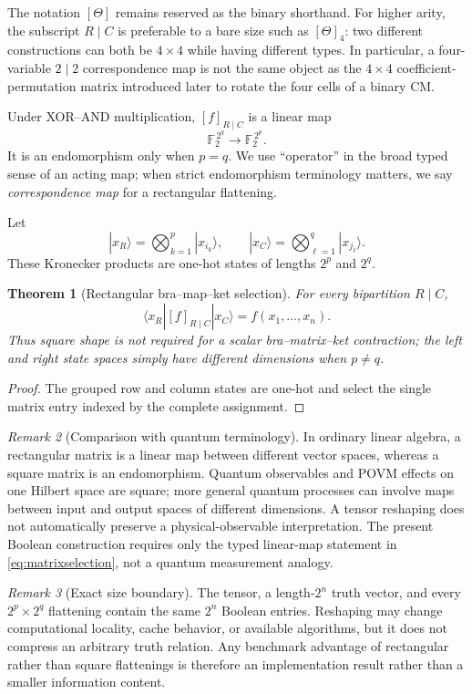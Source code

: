 \documentclass[11pt]{article}
\newtheorem{theorem}{Theorem}[section]
\theoremstyle{definition}
\theoremstyle{remark}
\newtheorem{remark}[theorem]{Remark}
\newcommand{\F}{\mathbb F}
\begin{document}
The notation $[\Theta]$ remains reserved as the binary shorthand.  For higher arity, the subscript $R\mid C$ is preferable to a bare size such as $[\Theta]_4$: two different constructions can both be $4\times4$ while having different types.  In particular, a four-variable $2\mid2$ correspondence map is not the same object as the $4\times4$ coefficient-permutation matrix introduced later to rotate the four cells of a binary CM.

Under XOR--AND multiplication, $[f]_{R\mid C}$ is a linear map
\[
 \F_2^{\,2^q}\longrightarrow\F_2^{\,2^p}.
\]
It is an endomorphism only when $p=q$.  We use ``operator'' in the broad typed sense of an acting map; when strict endomorphism terminology matters, we say \emph{correspondence map} for a rectangular flattening.

Let
\[
 |x_R\rangle=\bigotimes_{k=1}^p|x_{i_k}\rangle,
 \qquad
 |x_C\rangle=\bigotimes_{\ell=1}^q|x_{j_\ell}\rangle.
\]
These Kronecker products are one-hot states of lengths $2^p$ and $2^q$.
\begin{theorem}[Rectangular bra--map--ket selection]
For every bipartition $R\mid C$,
\begin{equation}
 \langle x_R|[f]_{R\mid C}|x_C\rangle
 =f(x_1,\ldots,x_n).
 \label{eq:matrixselection}
\end{equation}
Thus square shape is not required for a scalar bra--matrix--ket contraction; the left and right state spaces simply have different dimensions when $p\ne q$.
\end{theorem}
\begin{proof}
The grouped row and column states are one-hot and select the single matrix entry indexed by the complete assignment.
\end{proof}

\begin{remark}[Comparison with quantum terminology]
In ordinary linear algebra, a rectangular matrix is a linear map between different vector spaces, whereas a square matrix is an endomorphism.  Quantum observables and POVM effects on one Hilbert space are square; more general quantum processes can involve maps between input and output spaces of different dimensions.  A tensor reshaping does not automatically preserve a physical-observable interpretation.  The present Boolean construction requires only the typed linear-map statement in \eqref{eq:matrixselection}, not a quantum measurement analogy.
\end{remark}

\begin{remark}[Exact size boundary]
The tensor, a length-$2^n$ truth vector, and every $2^p\times2^q$ flattening contain the same $2^n$ Boolean entries.  Reshaping may change computational locality, cache behavior, or available algorithms, but it does not compress an arbitrary truth relation.  Any benchmark advantage of rectangular rather than square flattenings is therefore an implementation result rather than a smaller information content.
\end{remark}
\end{document}
